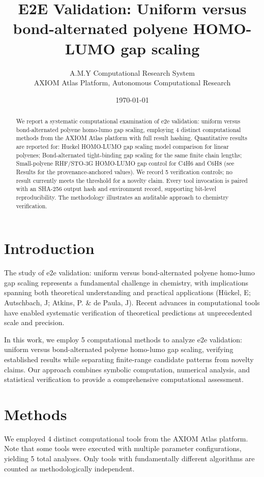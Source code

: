 \documentclass[11pt,a4paper]{article}
\title{E2E Validation: Uniform versus bond-alternated polyene HOMO-LUMO gap scaling}
\author{A.M.Y Computational Research System\\
\small AXIOM Atlas Platform, Autonomous Computational Research}
\date{\today}
\begin{document}
\maketitle

\begin{abstract}
We report a systematic computational examination of e2e validation: uniform versus bond-alternated polyene homo-lumo gap scaling, employing 4 distinct computational methods from the AXIOM Atlas platform with full result hashing. Quantitative results are reported for: Huckel HOMO-LUMO gap scaling model comparison for linear polyenes; Bond-alternated tight-binding gap scaling for the same finite chain lengths; Small-polyene RHF/STO-3G HOMO-LUMO gap control for C4H6 and C6H8 (see Results for the provenance-anchored values). We record 5 verification controls; no result currently meets the threshold for a novelty claim. Every tool invocation is paired with an SHA-256 output hash and environment record, supporting bit-level reproducibility. The methodology illustrates an auditable approach to chemistry verification.
\end{abstract}

\section{Introduction}
The study of e2e validation: uniform versus bond-alternated polyene homo-lumo gap scaling represents a fundamental challenge in chemistry, with implications spanning both theoretical understanding and practical applications (Hückel, E; Autschbach, J; Atkins, P. \& de Paula, J). Recent advances in computational tools have enabled systematic verification of theoretical predictions at unprecedented scale and precision.

In this work, we employ 5 computational methods to analyze e2e validation: uniform versus bond-alternated polyene homo-lumo gap scaling, verifying established results while separating finite-range candidate patterns from novelty claims. Our approach combines symbolic computation, numerical analysis, and statistical verification to provide a comprehensive computational assessment.


\section{Methods}
We employed 4 distinct computational tools from the AXIOM Atlas platform. Note that some tools were executed with multiple parameter configurations, yielding 5 total analyses. Only tools with fundamentally different algorithms are counted as methodologically independent.
\end{document}

